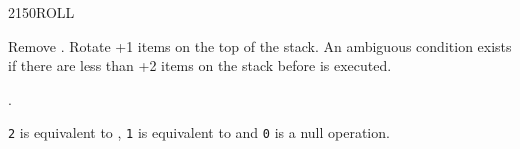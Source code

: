\vspace*{-6ex}
\begin{worddef}{2150}{ROLL}
\item {}

	Remove . Rotate +1 items on the top of the stack.
	An ambiguous condition exists if there are less than +2
	items on the stack before  is executed.

\see {}.

	\begin{rationale} %
		\texttt{2}  is equivalent to ,
		\texttt{1}  is equivalent to  and
		\texttt{0}  is a null operation.
	\end{rationale}
\end{worddef}

